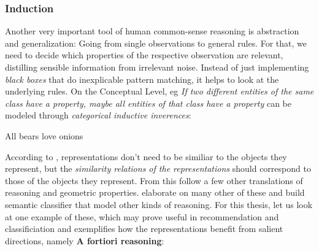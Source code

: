 \subsubsection*{Induction}

Another very important tool of human common-sense reasoning is abstraction and generalization: Going from single observations to general rules. For that, we need to decide which properties of the respective observation are relevant, distilling sensible information from irrelevant noise. Instead of just implementing \textit{black boxes} that do inexplicable pattern matching, it helps to look at the underlying rules. On the Conceptual Level, eg \textit{If two different entities of the same class have a property, maybe all entities of that class have a property} can be modeled through \textit{categorical inductive inverences}:

{All bears love onions \cite[226]{Gardenfors2000a}}





According to \textcite{Gardenfors2000a}, representations don't need to be similiar to the objects they represent, but the \textit{similarity relations of the representations} should correspond to those of the objects they represent. From this follow a few other translations of reasoning and geometric properties. \cite{Derrac2015} elaborate on many other of these and build semantic classifier that model other kinds of reasoning. For this thesis, let us look at one example of these, which may prove useful in recommendation and classificiation and exemplifies how the representations benefit from salient directions, namely \textbf{A fortiori reasoning}:
\vspace{2ex}


